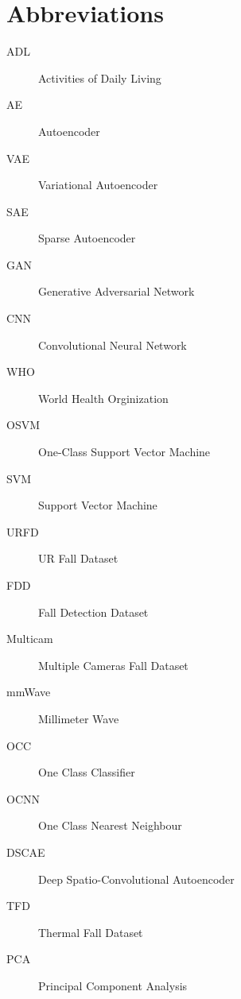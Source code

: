 \chapter*{Abbreviations}\label{abbr}
\begin{description}
\item[ADL] Activities of Daily Living
\item[AE] Autoencoder
\item[VAE] Variational Autoencoder
\item[SAE] Sparse Autoencoder 
\item[GAN] Generative Adversarial Network
\item[CNN] Convolutional Neural Network
\item[WHO] World Health Orginization
\item[OSVM] One-Class Support Vector Machine
\item[SVM] Support Vector Machine
\item[URFD] UR Fall Dataset
\item[FDD] Fall Detection Dataset
\item[Multicam] Multiple Cameras Fall Dataset
\item[mmWave] Millimeter Wave
\item[OCC] One Class Classifier
\item[OCNN] One Class Nearest Neighbour
\item[DSCAE] Deep Spatio-Convolutional Autoencoder
\item[TFD] Thermal Fall Dataset
\item[PCA] Principal Component Analysis
\end{description}

